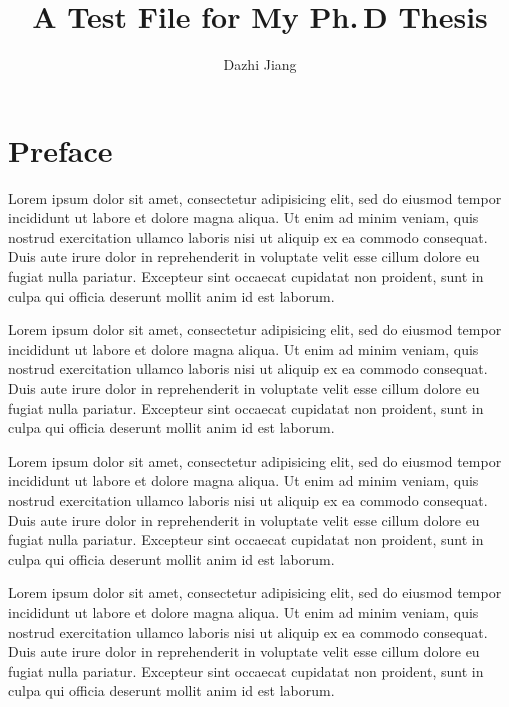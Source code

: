 \documentclass[10pt,a4paper,extrafontsizes,oldfontcommands,oneside]{memoir}
\author{Dazhi Jiang}
\title{A Test File for My Ph.\,D Thesis}
\begin{document}

\frontmatter

\maketitle

\chapter*{Preface}
Lorem ipsum dolor sit amet, consectetur adipisicing elit, sed do eiusmod tempor incididunt ut labore et dolore magna aliqua. Ut enim ad minim veniam, quis nostrud exercitation ullamco laboris nisi ut aliquip ex ea commodo consequat. Duis aute irure dolor in reprehenderit in voluptate velit esse cillum dolore eu fugiat nulla pariatur. Excepteur sint occaecat cupidatat non proident, sunt in culpa qui officia deserunt mollit anim id est laborum.

Lorem ipsum dolor sit amet, consectetur adipisicing elit, sed do eiusmod tempor incididunt ut labore et dolore magna aliqua. Ut enim ad minim veniam, quis nostrud exercitation ullamco laboris nisi ut aliquip ex ea commodo consequat. Duis aute irure dolor in reprehenderit in voluptate velit esse cillum dolore eu fugiat nulla pariatur. Excepteur sint occaecat cupidatat non proident, sunt in culpa qui officia deserunt mollit anim id est laborum.

Lorem ipsum dolor sit amet, consectetur adipisicing elit, sed do eiusmod tempor incididunt ut labore et dolore magna aliqua. Ut enim ad minim veniam, quis nostrud exercitation ullamco laboris nisi ut aliquip ex ea commodo consequat. Duis aute irure dolor in reprehenderit in voluptate velit esse cillum dolore eu fugiat nulla pariatur. Excepteur sint occaecat cupidatat non proident, sunt in culpa qui officia deserunt mollit anim id est laborum.

Lorem ipsum dolor sit amet, consectetur adipisicing elit, sed do eiusmod tempor incididunt ut labore et dolore magna aliqua. Ut enim ad minim veniam, quis nostrud exercitation ullamco laboris nisi ut aliquip ex ea commodo consequat. Duis aute irure dolor in reprehenderit in voluptate velit esse cillum dolore eu fugiat nulla pariatur. Excepteur sint occaecat cupidatat non proident, sunt in culpa qui officia deserunt mollit anim id est laborum.
\end{document}
